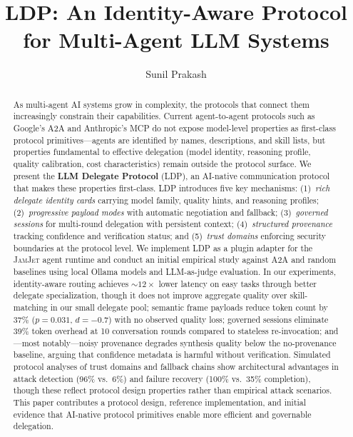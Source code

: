 \documentclass[11pt,a4paper]{article}
\newcommand{\ldp}{\textsc{LDP}}
\newcommand{\atoa}{\textsc{A2A}}
\newcommand{\jamjet}{\textsc{JamJet}}
\begin{document}
\title{\textbf{LDP: An Identity-Aware Protocol for Multi-Agent LLM Systems}}

\author[1]{Sunil Prakash}

\date{}

\maketitle


\begin{abstract}
As multi-agent AI systems grow in complexity, the protocols that connect them increasingly constrain their capabilities.
Current agent-to-agent protocols such as Google's A2A and Anthropic's MCP do not expose model-level properties as first-class protocol primitives---agents are identified by names, descriptions, and skill lists, but properties fundamental to effective delegation (model identity, reasoning profile, quality calibration, cost characteristics) remain outside the protocol surface.
We present the \textbf{LLM Delegate Protocol} (\ldp{}), an AI-native communication protocol that makes these properties first-class.
\ldp{} introduces five key mechanisms: (1)~\emph{rich delegate identity cards} carrying model family, quality hints, and reasoning profiles;
(2)~\emph{progressive payload modes} with automatic negotiation and fallback;
(3)~\emph{governed sessions} for multi-round delegation with persistent context;
(4)~\emph{structured provenance} tracking confidence and verification status;
and (5)~\emph{trust domains} enforcing security boundaries at the protocol level.
We implement \ldp{} as a plugin adapter for the \jamjet{} agent runtime and conduct an initial empirical study against \atoa{} and random baselines using local Ollama models and LLM-as-judge evaluation.
In our experiments, identity-aware routing achieves ${\sim}12\times$ lower latency on easy tasks through better delegate specialization, though it does not improve aggregate quality over skill-matching in our small delegate pool; semantic frame payloads reduce token count by 37\% ($p{=}0.031$, $d{=}{-}0.7$) with no observed quality loss; governed sessions eliminate 39\% token overhead at 10 conversation rounds compared to stateless re-invocation; and---most notably---noisy provenance degrades synthesis quality below the no-provenance baseline, arguing that confidence metadata is harmful without verification.
Simulated protocol analyses of trust domains and fallback chains show architectural advantages in attack detection (96\% vs.\ 6\%) and failure recovery (100\% vs.\ 35\% completion), though these reflect protocol design properties rather than empirical attack scenarios.
This paper contributes a protocol design, reference implementation, and initial evidence that AI-native protocol primitives enable more efficient and governable delegation.


\end{abstract}
\end{document}
